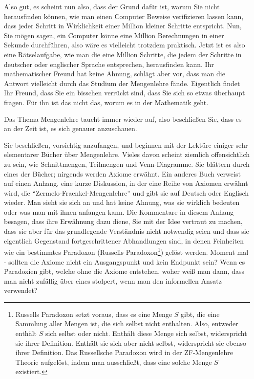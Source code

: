 Also gut, es scheint nun also, dass der Grund dafür ist, warum Sie nicht herausfinden können, wie man einen Computer Beweise verifizieren lassen kann, dass jeder Schritt in Wirklichkeit einer Million kleiner Schritte entspricht.  Nun, Sie mögen sagen, ein Computer könne eine Million Berechnungen in einer Sekunde durchführen, also wäre es vielleicht trotzdem praktisch.  Jetzt ist es also eine Rätselaufgabe, wie man die eine Million Schritte, die jedem der Schritte in deutscher oder englischer Sprache entsprechen, herausfinden kann.  Ihr mathematischer Freund hat keine Ahnung, schlägt aber vor, dass man die Antwort vielleicht durch das Studium der Mengenlehre fände.  Eigentlich findet Ihr Freund, dass Sie ein bisschen verrückt sind, dass Sie sich so etwas überhaupt fragen.  Für ihn ist das nicht das, worum es in der Mathematik geht.

Das Thema Mengenlehre taucht immer wieder auf, also beschließen Sie, dass es an der Zeit ist, es sich genauer anzuschauen.

Sie beschließen, vorsichtig anzufangen, und beginnen mit der Lektüre einiger sehr elementarer Bücher über Mengenlehre.  Vieles davon scheint ziemlich offensichtlich zu sein, wie Schnittmengen, Teilmengen und Venn-Diagramme.  Sie blättern durch eines der Bücher; nirgends werden Axiome erwähnt. Ein anderes Buch verweist auf einen Anhang, eine kurze Diskussion, in der eine Reihe von Axiomen erwähnt wird, die "`Zermelo-Fraenkel-Mengenlehre"' und gibt sie auf Deutsch oder Englisch wieder.  Man sieht sie sich an und hat keine Ahnung, was sie wirklich bedeuten oder was man mit ihnen anfangen kann.  Die Kommentare in diesem Anhang besagen, dass ihre Erwähnung dazu diene, Sie mit der Idee vertraut zu machen, dass sie aber für das grundlegende Verständnis nicht notwendig seien und dass sie eigentlich Gegenstand fortgeschrittener Abhandlungen sind, in denen Feinheiten wie ein bestimmtes Paradoxon (Russells Paradoxon\footnote{Russells Paradoxon setzt voraus, dass es eine Menge $S$ gibt, die eine Sammlung aller Mengen ist, die sich selbst nicht enthalten.  Also, entweder enthält $S$ sich selbst oder nicht.  Enthält diese Menge sich selbst, widerspricht sie ihrer Definition.  Enthält sie sich aber nicht selbst, widerspricht sie ebenso ihrer Definition.  Das Russellsche Paradoxon wird in der ZF-Mengenlehre Theorie aufgelöst, indem man ausschließt, dass eine solche Menge $S$ existiert.}) gelöst werden.  Moment mal - sollten die Axiome nicht ein Ausgangspunkt und kein Endpunkt sein?  Wenn es Paradoxien gibt, welche ohne die Axiome entstehen, woher weiß man dann, dass man nicht zufällig über eines stolpert, wenn man den informellen Ansatz verwendet?

